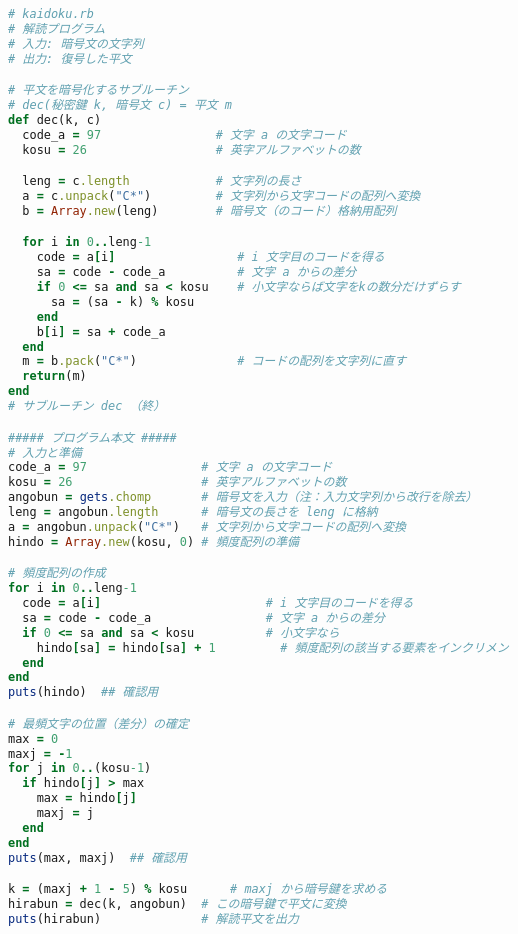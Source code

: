 \documentclass{jsarticle}
\begin{document}
\begin{lstlisting}[language=ruby]
# kaidoku.rb
# 解読プログラム
# 入力: 暗号文の文字列
# 出力: 復号した平文

# 平文を暗号化するサブルーチン
# dec(秘密鍵 k, 暗号文 c) = 平文 m
def dec(k, c)
  code_a = 97                # 文字 a の文字コード
  kosu = 26                  # 英字アルファベットの数

  leng = c.length            # 文字列の長さ
  a = c.unpack("C*")         # 文字列から文字コードの配列へ変換
  b = Array.new(leng)        # 暗号文（のコード）格納用配列

  for i in 0..leng-1
    code = a[i]                 # i 文字目のコードを得る
    sa = code - code_a          # 文字 a からの差分
    if 0 <= sa and sa < kosu    # 小文字ならば文字をkの数分だけずらす
      sa = (sa - k) % kosu
    end
    b[i] = sa + code_a
  end
  m = b.pack("C*")              # コードの配列を文字列に直す
  return(m)
end
# サブルーチン dec （終）

##### プログラム本文 #####
# 入力と準備
code_a = 97                # 文字 a の文字コード
kosu = 26                  # 英字アルファベットの数
angobun = gets.chomp       # 暗号文を入力（注：入力文字列から改行を除去）
leng = angobun.length      # 暗号文の長さを leng に格納
a = angobun.unpack("C*")   # 文字列から文字コードの配列へ変換
hindo = Array.new(kosu, 0) # 頻度配列の準備

# 頻度配列の作成
for i in 0..leng-1
  code = a[i]                       # i 文字目のコードを得る
  sa = code - code_a                # 文字 a からの差分
  if 0 <= sa and sa < kosu          # 小文字なら
    hindo[sa] = hindo[sa] + 1         # 頻度配列の該当する要素をインクリメント
  end
end
puts(hindo)  ## 確認用

# 最頻文字の位置（差分）の確定
max = 0
maxj = -1
for j in 0..(kosu-1)
  if hindo[j] > max
    max = hindo[j]
    maxj = j
  end
end
puts(max, maxj)  ## 確認用

k = (maxj + 1 - 5) % kosu      # maxj から暗号鍵を求める
hirabun = dec(k, angobun)  # この暗号鍵で平文に変換
puts(hirabun)              # 解読平文を出力

\end{lstlisting}
\end{document}
